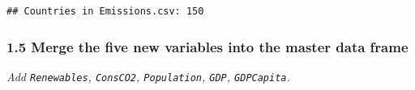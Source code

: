 \documentclass[
]{article}
\newenvironment{Shaded}{\begin{snugshade}}{\end{snugshade}}
\newcommand{\FunctionTok}[1]{\textcolor[rgb]{0.13,0.29,0.53}{\textbf{#1}}}
\newcommand{\NormalTok}[1]{#1}
\newcommand{\OtherTok}[1]{\textcolor[rgb]{0.56,0.35,0.01}{#1}}
\newcommand{\SpecialCharTok}[1]{\textcolor[rgb]{0.81,0.36,0.00}{\textbf{#1}}}
\newcommand{\StringTok}[1]{\textcolor[rgb]{0.31,0.60,0.02}{#1}}
\begin{document}
\begin{Shaded}
\end{Shaded}

\begin{verbatim}
## Countries in Emissions.csv: 150
\end{verbatim}

\subsubsection{1.5 Merge the five new variables into the master data
frame}\label{merge-the-five-new-variables-into-the-master-data-frame}

\emph{Add \texttt{Renewables}, \texttt{ConsCO2}, \texttt{Population},
\texttt{GDP}, \texttt{GDPCapita}.}
\end{document}
